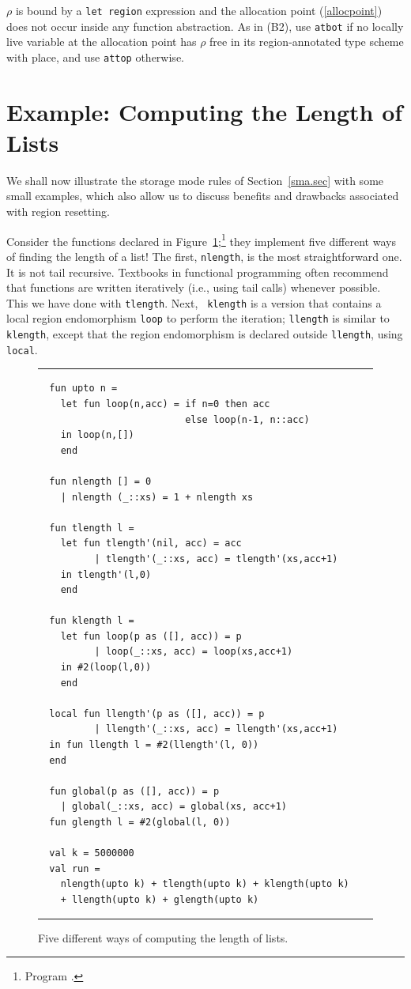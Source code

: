 \documentclass[12pt]{book}
\begin{document}
 $\rho$ is bound by a {\tt let region} expression
and the allocation point (\ref{allocpoint}) does not occur inside any
function abstraction.  As in (B2), use {\tt atbot} if no locally live
variable at the allocation point has $\rho$ free in its
region-annotated type scheme with place, and use {\tt attop}
otherwise.


\section{Example: Computing the Length of Lists}
\label{length.sec}
We shall now illustrate the storage mode rules of
Section~\ref{sma.sec} with some small examples, which also allow us to
discuss benefits and drawbacks associated with region resetting.

Consider the functions declared in
Figure~\ref{length.fig};\footnote{Program .}
they implement five different ways of finding the length of a list!
The first, {\tt nlength}, is the most straightforward one.  It is not
tail recursive. Textbooks in functional programming often recommend
that functions are written iteratively (i.e., using tail calls)
whenever possible. This we have done with {\tt tlength}.  Next, {\tt
  klength} is a version that contains a local
%
region endomorphism {\tt loop} to perform the iteration; {\tt llength}
is similar to {\tt klength}, except that the region endomorphism is
declared outside {\tt llength}, using
%
{\tt local}.
\begin{figure}
\hrule
\medskip
\begin{verbatim}
  fun upto n =
    let fun loop(n,acc) = if n=0 then acc
                          else loop(n-1, n::acc)
    in loop(n,[])
    end

  fun nlength [] = 0
    | nlength (_::xs) = 1 + nlength xs

  fun tlength l =
    let fun tlength'(nil, acc) = acc
          | tlength'(_::xs, acc) = tlength'(xs,acc+1)
    in tlength'(l,0)
    end

  fun klength l =
    let fun loop(p as ([], acc)) = p
          | loop(_::xs, acc) = loop(xs,acc+1)
    in #2(loop(l,0))
    end

  local fun llength'(p as ([], acc)) = p
          | llength'(_::xs, acc) = llength'(xs,acc+1)
  in fun llength l = #2(llength'(l, 0))
  end

  fun global(p as ([], acc)) = p
    | global(_::xs, acc) = global(xs, acc+1)
  fun glength l = #2(global(l, 0))

  val k = 5000000
  val run =
    nlength(upto k) + tlength(upto k) + klength(upto k)
    + llength(upto k) + glength(upto k)
\end{verbatim}
\caption{Five different ways of computing the length of lists.}
\bigskip
\label{length.fig}
\hrule
\end{figure}
\end{document}
